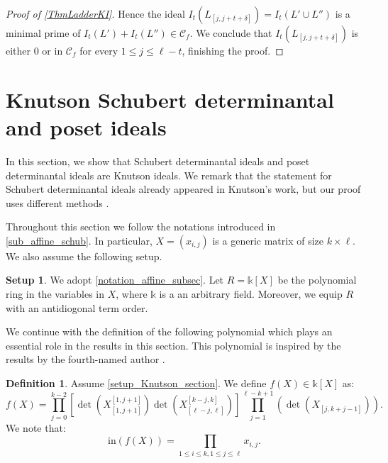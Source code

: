 \documentclass[12pt]{amsart}
\theoremstyle{definition}
\newtheorem{definition}[definition]{Definition}
\newtheorem{setup}[setup]{Setup}
\renewcommand{\(}{\left(}
\renewcommand{\)}{\right)}
\newcommand{\kk}{\mathbb{k}}
\renewcommand{\!}[1]{{\color{red}\text{\Huge$\star$ }#1}}
\newcommand{\ls}{\leqslant}%
\newcommand{\init}{\mathrm{in}}
\begin{document}
\begin{proof}[Proof of \autoref{ThmLadderKI}]
 Hence the ideal
%
%
$I_t(L_{[j,j+t+\delta]})=I_t(L' \cup L'')$ is a minimal prime of $I_t(L')+I_t(L'') \in \mathcal{C}_f$. We conclude  that $I_t(L_{[j,j+t+\delta]})$ is either 0 or in $\mathcal{C}_f$ for every $1\ls j\ls  \ell-t$, finishing the proof.  
\end{proof}


\section{Knutson  Schubert determinantal and poset ideals}\label{SectionSchubertMSV}

In this section, we show that Schubert determinantal ideals and poset determinantal ideals are Knutson ideals. We remark that the statement for  Schubert determinantal ideals  already appeared in Knutson's work, but our proof uses different methods \cite{knutson2009frobenius}. %

Throughout this section we follow the notations introduced in \autoref{sub_affine_schub}. In particular, $X=(x_{i,j})$ is a generic matrix of size $k \times \ell$. %
We also assume the following setup.

\begin{setup}\label{setup_Knutson_section}
	We adopt  \autoref{notation_affine_subsec}. %
	Let $R=\kk[X]$ be the polynomial ring in the variables in $X$, where $\kk$ is a an arbitrary field. Moreover, we equip $R$ with an antidiogonal term order.
\end{setup}




We continue with the definition of the following polynomial which plays an essential role in the results in this section. This polynomial is inspired by the results by the fourth-named author \cite{seccia2022knutson}.
\begin{definition}\label{def_f(X)}
	Assume  \autoref{setup_Knutson_section}. We define $f(X) \in \kk[X]$ as: %
	$$f(X)= \prod_{j=0}^{k-2} \left[\det \left(X_{[1,j+1]}^{[1,j+1]}\right) 
	\det \left(X^{[k-j,k]}_{[\ell-j,\ell]}\right) \right] 
	\prod_{j=1}^{\ell-k+1} \left(\det \left(X_{[j,k+j-1]}\right) \right).$$ 
	We note that: 
	$$\init (f(X))= \prod \limits_{1\ls i\ls k,1\ls j\ls \ell} x_{i,j}.$$
\end{definition}
\end{document}

